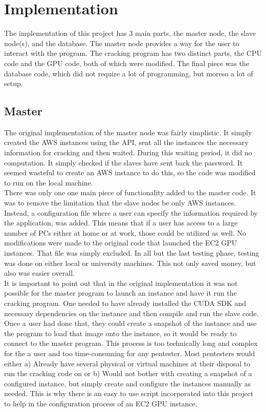 \documentclass[12pt]{article}
\begin{document}
\section{Implementation}
The implementation of this project has 3 main parts, the master node, the slave node(s), and the database. The master node provides a way for the user to interact with the program. The cracking program has two distinct parts, the CPU code and the GPU code, both of which were modified. The final piece was the database code, which did not require a lot of programming, but moreso a lot of setup.
\subsection{Master}
\indent The original implementation of the master node was fairly simplistic. It simply created the AWS instances using the API, sent all the instances the necessary information for cracking and then waited. During this waiting period, it did no computation. It simply checked if the slaves have sent back the password. It seemed wasteful to create an AWS instance to do this, so the code was modified to run on the local machine. \\
\indent There was only one one main piece of functionality added to the master code. It was to  remove the limitation that the slave nodes be only AWS instances. Instead, a configuration file where a user can specify the information required by the application, was added. This means that if a user has access to a large number of PCs either at home or at work, those could be utilized as well. No modifications were made to the original code that launched the EC2 GPU instances. That file was simply excluded. In all but the last testing phase, testing was done on either local or university machines. This not only saved money, but also was easier overall.\\
\indent It is important to point out that in the original implementation it was not possible for the master program to launch an instance and have it run the cracking program. One needed to have already installed the CUDA SDK and necessary dependencies on the instance and then compile and run the slave code. Once a user had done that, they could create a snapshot of the instance and use the program to load that image onto the instance, so it would be ready to connect to the master program. This process is too technically long and complex for the a user and too time-consuming for any pentester. Most pentesters would either a) Already have several physical or virtual machines at their disposal to run the cracking code on or b) Would not bother with creating a snapshot of a configured instance, but simply create and configure the instances manually as needed. This is why there is an easy to use script incorporated into this project to help in the configuration process of an EC2 GPU instance.
\end{document}
